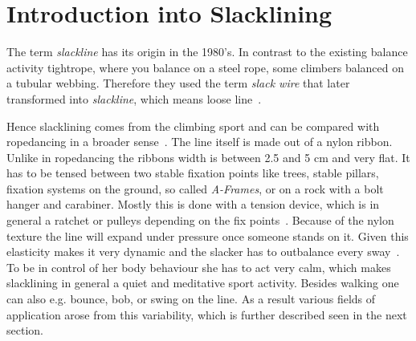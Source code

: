 \section{Introduction into Slacklining}\label{3_1_introductionSlacklining}
The term \textit{slackline} has its origin in the 1980's. In contrast to the existing balance activity tightrope, where you balance on a steel rope, some climbers balanced on a tubular webbing. Therefore they used the term \textit{slack wire} that later transformed into \textit{slackline}, which means loose line~\cite{Zak2011-sl, Balcom2005-wl, MillerMauser2013-sl}.

Hence slacklining comes from the climbing sport and can be compared with ropedancing in a broader sense~\cite{Kleindl2011-bl}. The line itself is made out of a nylon ribbon. Unlike in ropedancing the ribbons width is between 2.5 and 5 cm and very flat. It has to be tensed between two stable fixation points like trees, stable pillars, fixation systems on the ground, so called \textit{A-Frames}, or on a rock with a bolt hanger and carabiner. Mostly this is done with a tension device, which is in general a ratchet or pulleys depending on the fix points~\cite{Kleindl2011-bl}. Because of the nylon texture the line will expand under pressure once someone stands on it. Given this elasticity makes it very dynamic and the slacker has to outbalance every sway~\cite{Kroiss2007-ab}. To be in control of her body behaviour she has to act very calm, which makes slacklining in general a quiet and meditative sport activity. Besides walking one can also e.g. bounce, bob, or swing on the line. As a result various fields of application arose from this variability, which is further described seen in the next section.